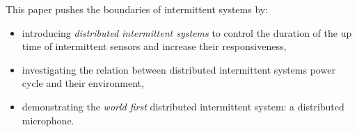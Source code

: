 This paper pushes the boundaries of intermittent systems by:
\begin{itemize}
		\item introducing \textit{distributed intermittent systems} to control the duration of the up time of intermittent sensors and increase their responsiveness,
		\item investigating the relation between distributed intermittent systems power cycle and their environment,
		\item demonstrating the \textit{world first} distributed intermittent system: a distributed microphone. 
\end{itemize}



